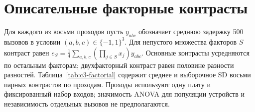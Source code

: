 \FloatBarrier

\section{Описательные факторные контрасты}
\label{app:factorial}
Для каждого из восьми проходов пусть $y_{abc}$ обозначает среднюю задержку 500 вызовов в условии $(a,b,c)\in\{-1,1\}^3$. Для непустого множества факторов $S$ контраст равен $e_S=\frac14\sum_{a,b,c}(\prod_{j\in S}x_j)y_{abc}$. Основные контрасты усредняются по остальным факторам; двухфакторный контраст равен половине разности разностей. Таблица~\ref{tab:c3-factorial} содержит среднее и выборочное SD восьми парных контрастов по проходам. Проходы используют одну плату и фиксированный набор входов; значимость ANOVA для популяции устройств и независимость отдельных вызовов не предполагаются.


\FloatBarrier


\FloatBarrier

\FloatBarrier

